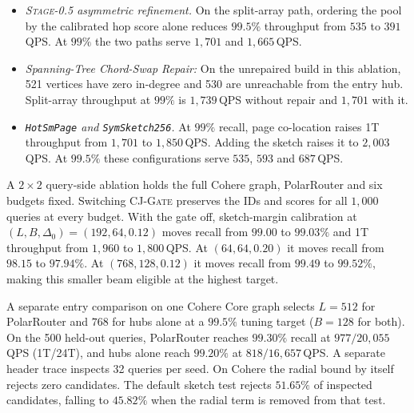 \begin{itemize}
We also rebuilt QuadriPrune alongside a simpler graph for each of three seeds, alternating the run order. The simpler policy ranks candidates by two-bit angular loss and selects up to 16 of 32 neighbors by angular diversity ($\alpha=1.2$), with neither a shell shield nor dedicated geodesic or elevator passes. Both policies then use the same depth-aware refill, chord repair, entries and Core scoring. All six graphs reach every vertex with 32 million directed edges. In the first pair at the $99\%$ target, QuadriPrune serves $1{,}946$\,QPS at $99.08\%$ recall and the quota graph $1{,}721$ at $99.03\%$. At the $99.5\%$ target, the quota graph needs $L=384$ on all three builds ($1{,}057$--$1{,}064$\,QPS), while QuadriPrune needs $L=768$--$1{,}024$ ($638$--$786$\,QPS), all at $B=128$. Thus the throughput advantage on this shell changes direction with the recall target.
  \item \emph{\textsc{Stage-0.5} asymmetric refinement.}
  On the split-array path, ordering the pool by the calibrated hop score alone reduces $99.5\%$ throughput from $535$ to $391$\,QPS. At $99\%$ the two paths serve $1{,}701$ and $1{,}665$\,QPS.
  \item \emph{Spanning-Tree Chord-Swap Repair:}
  On the unrepaired build in this ablation, 521 vertices have zero in-degree and 530 are unreachable from the entry hub. Split-array throughput at $99\%$ is $1{,}739$\,QPS without repair and $1{,}701$ with it.
  \item \emph{\texttt{HotSmPage} and \texttt{SymSketch256}.}
  At $99\%$ recall, page co-location raises 1T throughput from $1{,}701$ to $1{,}850$\,QPS. Adding the sketch raises it to $2{,}003$\,QPS. At $99.5\%$ these configurations serve $535$, $593$ and $687$\,QPS.
\end{itemize}

A $2\times2$ query-side ablation holds the full Cohere graph, PolarRouter and six budgets fixed. Switching \textsc{CJ-Gate} preserves the IDs and scores for all $1{,}000$ queries at every budget. With the gate off, sketch-margin calibration at $(L,B,\Delta_0)=(192,64,0.12)$ moves recall from $99.00$ to $99.03\%$ and 1T throughput from $1{,}960$ to $1{,}800$\,QPS. At $(64,64,0.20)$ it moves recall from $98.15$ to $97.94\%$. At $(768,128,0.12)$ it moves recall from $99.49$ to $99.52\%$, making this smaller beam eligible at the highest target.

A separate entry comparison on one Cohere Core graph selects $L=512$ for PolarRouter and $768$ for hubs alone at a $99.5\%$ tuning target ($B=128$ for both). On the 500 held-out queries, PolarRouter reaches $99.30\%$ recall at $977/20{,}055$\,QPS (1T/24T), and hubs alone reach $99.20\%$ at $818/16{,}657$\,QPS. A separate header trace inspects 32 queries per seed. On Cohere the radial bound by itself rejects zero candidates. The default sketch test rejects $51.65\%$ of inspected candidates, falling to $45.82\%$ when the radial term is removed from that test.


